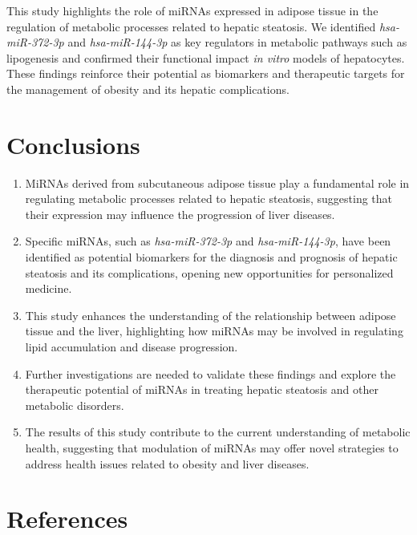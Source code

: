 \documentclass[
  11pt,
  letterpaper,
]{book}
\begin{document}
This study highlights the role of miRNAs expressed in adipose tissue in
the regulation of metabolic processes related to hepatic steatosis. We
identified \emph{hsa-miR-372-3p} and \emph{hsa-miR-144-3p} as key
regulators in metabolic pathways such as lipogenesis and confirmed their
functional impact \emph{in vitro} models of hepatocytes. These findings
reinforce their potential as biomarkers and therapeutic targets for the
management of obesity and its hepatic complications.

\chapter{Conclusions}\label{conclusions}

\begin{enumerate}
\def\labelenumi{\arabic{enumi}.}
\item
  MiRNAs derived from subcutaneous adipose tissue play a fundamental
  role in regulating metabolic processes related to hepatic steatosis,
  suggesting that their expression may influence the progression of
  liver diseases.
\item
  Specific miRNAs, such as \emph{hsa-miR-372-3p} and
  \emph{hsa-miR-144-3p}, have been identified as potential biomarkers
  for the diagnosis and prognosis of hepatic steatosis and its
  complications, opening new opportunities for personalized medicine.
\item
  This study enhances the understanding of the relationship between
  adipose tissue and the liver, highlighting how miRNAs may be involved
  in regulating lipid accumulation and disease progression.
\item
  Further investigations are needed to validate these findings and
  explore the therapeutic potential of miRNAs in treating hepatic
  steatosis and other metabolic disorders.
\item
  The results of this study contribute to the current understanding of
  metabolic health, suggesting that modulation of miRNAs may offer novel
  strategies to address health issues related to obesity and liver
  diseases.
\end{enumerate}

\backmatter

\chapter{References}\label{references}
\end{document}
